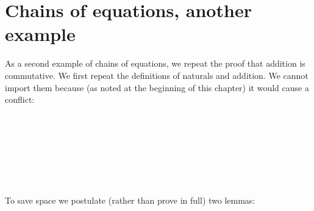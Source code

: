 \hypertarget{chains-of-equations-another-example}{%
\section{Chains of equations, another
example}\label{chains-of-equations-another-example}}

As a second example of chains of equations, we repeat the proof that
addition is commutative. We first repeat the definitions of naturals and
addition. We cannot import them because (as noted at the beginning of
this chapter) it would cause a conflict:

\begin{fence}
\begin{code}%
\>[0]\AgdaSpace{}%
\AgdaSpace{}%
\AgdaSymbol{:}\AgdaSpace{}%
\AgdaSpace{}%
\<%
\\
\>[0][@{}l@{\AgdaIndent{0}}]%
\>[2]\AgdaSpace{}%
\AgdaSymbol{:}\AgdaSpace{}%
\<%
\\
%
\>[2]%
\>[7]\AgdaSymbol{:}\AgdaSpace{}%
\AgdaSpace{}%
\AgdaSpace{}%
\<%
\\
%
\\[\AgdaEmptyExtraSkip]%
\>[0]\AgdaOperator{\AgdaFunction{\AgdaUnderscore{}+\AgdaUnderscore{}}}\AgdaSpace{}%
\AgdaSymbol{:}\AgdaSpace{}%
\AgdaSpace{}%
\AgdaSpace{}%
\AgdaSpace{}%
\AgdaSpace{}%
\<%
\\
\>[0]%
\>[8]\AgdaOperator{\AgdaFunction{+}}\AgdaSpace{}%
%
\>[13]\AgdaSymbol{=}%
\>[16]\<%
\\
\>[0]\AgdaSymbol{(}\AgdaSpace{}%
\AgdaSymbol{)}\AgdaSpace{}%
\AgdaOperator{\AgdaFunction{+}}\AgdaSpace{}%
%
\>[13]\AgdaSymbol{=}%
\>[16]\AgdaSpace{}%
\AgdaSymbol{(}\AgdaSpace{}%
\AgdaOperator{\AgdaFunction{+}}\AgdaSpace{}%
\AgdaSymbol{)}\<%
\end{code}
\end{fence}

To save space we postulate (rather than prove in full) two lemmas:

